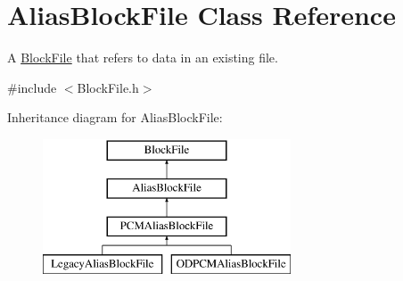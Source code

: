 \hypertarget{class_alias_block_file}{}\section{Alias\+Block\+File Class Reference}
\label{class_alias_block_file}


A \hyperlink{class_block_file}{Block\+File} that refers to data in an existing file.  




{\ttfamily \#include $<$Block\+File.\+h$>$}

Inheritance diagram for Alias\+Block\+File\+:\begin{figure}[H]
\begin{center}
\leavevmode
\includegraphics[height=4.000000cm]{class_alias_block_file}
\end{center}
\end{figure}

